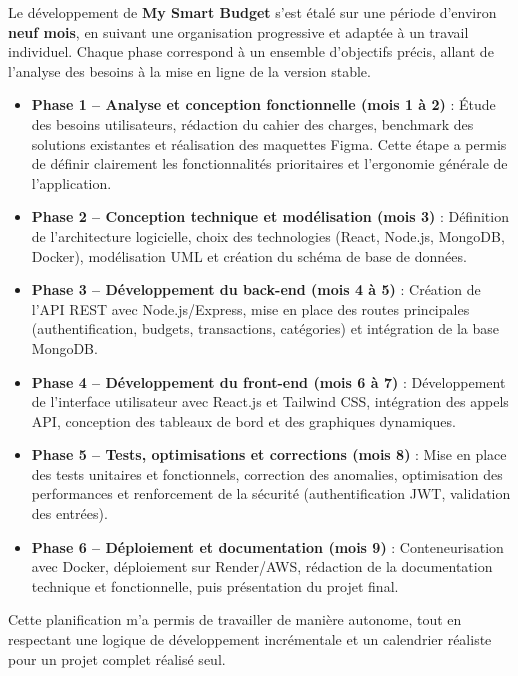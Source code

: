 \begin{tcolorbox}[colback=green!5!white,colframe=green!60!black,title=\textbf{Durée et planification du projet}]
Le développement de \textbf{My Smart Budget} s’est étalé sur une période d’environ \textbf{neuf mois}, en suivant une organisation progressive et adaptée à un travail individuel.  
Chaque phase correspond à un ensemble d’objectifs précis, allant de l’analyse des besoins à la mise en ligne de la version stable.

\begin{itemize}
    \item \textbf{Phase 1 – Analyse et conception fonctionnelle (mois 1 à 2)} :  
    Étude des besoins utilisateurs, rédaction du cahier des charges, benchmark des solutions existantes et réalisation des maquettes Figma.  
    Cette étape a permis de définir clairement les fonctionnalités prioritaires et l’ergonomie générale de l’application.

    \item \textbf{Phase 2 – Conception technique et modélisation (mois 3)} :  
    Définition de l’architecture logicielle, choix des technologies (React, Node.js, MongoDB, Docker), modélisation UML et création du schéma de base de données.

    \item \textbf{Phase 3 – Développement du back-end (mois 4 à 5)} :  
    Création de l’API REST avec Node.js/Express, mise en place des routes principales (authentification, budgets, transactions, catégories) et intégration de la base MongoDB.

    \item \textbf{Phase 4 – Développement du front-end (mois 6 à 7)} :  
    Développement de l’interface utilisateur avec React.js et Tailwind CSS, intégration des appels API, conception des tableaux de bord et des graphiques dynamiques.

    \item \textbf{Phase 5 – Tests, optimisations et corrections (mois 8)} :  
    Mise en place des tests unitaires et fonctionnels, correction des anomalies, optimisation des performances et renforcement de la sécurité (authentification JWT, validation des entrées).

    \item \textbf{Phase 6 – Déploiement et documentation (mois 9)} :  
    Conteneurisation avec Docker, déploiement sur Render/AWS, rédaction de la documentation technique et fonctionnelle, puis présentation du projet final.
\end{itemize}

Cette planification m’a permis de travailler de manière autonome, tout en respectant une logique de développement incrémentale et un calendrier réaliste pour un projet complet réalisé seul.
\end{tcolorbox}

